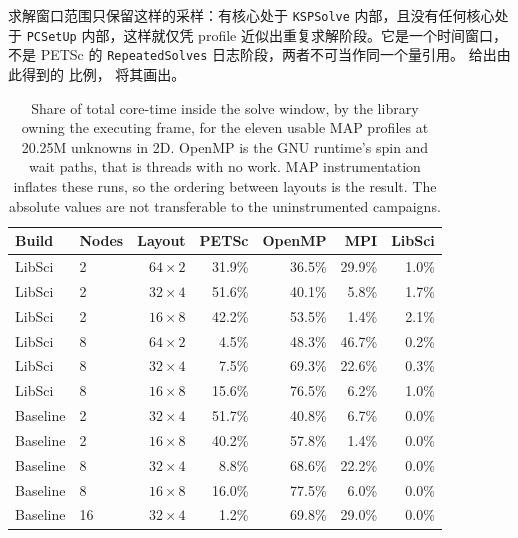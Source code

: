 \documentclass[11pt,a4paper,oneside]{report}
\begin{document}
求解窗口范围只保留这样的采样：有核心处于 \texttt{KSPSolve} 内部，且没有任何核心处于
\texttt{PCSetUp} 内部，这样就仅凭 profile 近似出重复求解阶段。它是一个时间窗口，不是 PETSc 的
\texttt{RepeatedSolves} 日志阶段，两者不可当作同一个量引用。 给出由此得到的
比例， 将其画出。

\begin{table}[htbp]
  \centering
  \caption{Share of total core-time inside the solve window, by the library owning the
  executing frame, for the eleven usable MAP profiles at 20.25M unknowns in 2D. OpenMP is
  the GNU runtime's spin and wait paths, that is threads with no work. MAP instrumentation
  inflates these runs, so the ordering between layouts is the result. The absolute values
  are not transferable to the uninstrumented campaigns.}
  \label{tab:map-shares}
  \begin{tabular}{llrrrrr}
    \toprule
    Build & Nodes & Layout & PETSc & OpenMP & MPI & LibSci \\
    \midrule
    LibSci   &  2 & $64\times2$ & 31.9\% & 36.5\% & 29.9\% & 1.0\% \\
    LibSci   &  2 & $32\times4$ & 51.6\% & 40.1\% &  5.8\% & 1.7\% \\
    LibSci   &  2 & $16\times8$ & 42.2\% & 53.5\% &  1.4\% & 2.1\% \\
    \addlinespace
    LibSci   &  8 & $64\times2$ &  4.5\% & 48.3\% & 46.7\% & 0.2\% \\
    LibSci   &  8 & $32\times4$ &  7.5\% & 69.3\% & 22.6\% & 0.3\% \\
    LibSci   &  8 & $16\times8$ & 15.6\% & 76.5\% &  6.2\% & 1.0\% \\
    \addlinespace
    Baseline &  2 & $32\times4$ & 51.7\% & 40.8\% &  6.7\% & 0.0\% \\
    Baseline &  2 & $16\times8$ & 40.2\% & 57.8\% &  1.4\% & 0.0\% \\
    Baseline &  8 & $32\times4$ &  8.8\% & 68.6\% & 22.2\% & 0.0\% \\
    Baseline &  8 & $16\times8$ & 16.0\% & 77.5\% &  6.0\% & 0.0\% \\
    Baseline & 16 & $32\times4$ &  1.2\% & 69.8\% & 29.0\% & 0.0\% \\
    \bottomrule
  \end{tabular}
\end{table}
\end{document}
